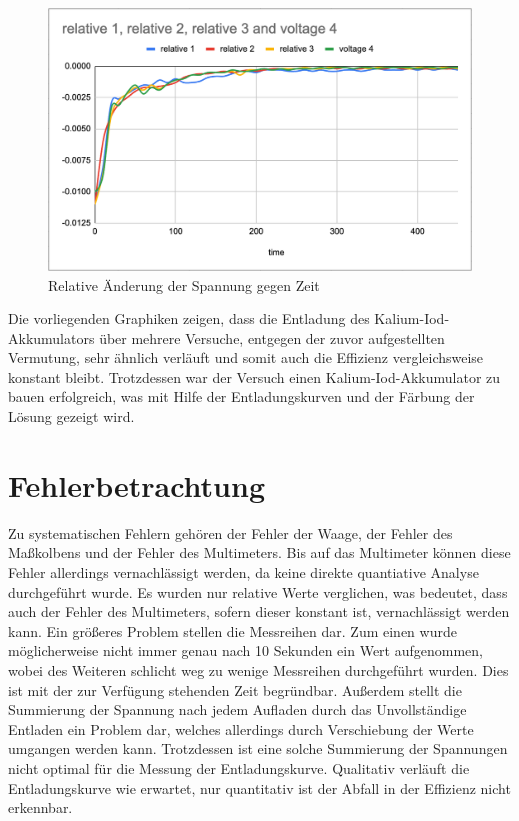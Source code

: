 \documentclass[11pt]{article}
\begin{document}
\begin{figure}[h!]
    \caption{Relative Änderung der Spannung gegen Zeit}
    \label{fig:relative_alt}
    \centering
    \includegraphics[scale=0.25]{relative_alt.png}
\end{figure}

\newpage
\noindent
Die vorliegenden Graphiken zeigen, dass die Entladung des Kalium-Iod-Akkumulators über mehrere Versuche, entgegen der zuvor aufgestellten Vermutung, sehr ähnlich verläuft und somit auch die Effizienz vergleichsweise konstant bleibt. Trotzdessen war der Versuch einen Kalium-Iod-Akkumulator zu bauen erfolgreich, was mit Hilfe der Entladungskurven und der Färbung der Lösung gezeigt wird.
\newpage
\section{Fehlerbetrachtung}
Zu systematischen Fehlern gehören der Fehler der Waage, der Fehler des Maßkolbens und der Fehler des Multimeters. Bis auf das Multimeter können diese Fehler allerdings vernachlässigt werden, da keine direkte quantiative Analyse durchgeführt wurde. Es wurden nur relative Werte verglichen, was bedeutet, dass auch der Fehler des Multimeters, sofern dieser konstant ist, vernachlässigt werden kann. Ein größeres Problem stellen die Messreihen dar. Zum einen wurde möglicherweise nicht immer genau nach 10 Sekunden ein Wert aufgenommen, wobei des Weiteren schlicht weg zu wenige Messreihen durchgeführt wurden. Dies ist mit der zur Verfügung stehenden Zeit begründbar. Außerdem stellt die Summierung der Spannung nach jedem Aufladen durch das Unvollständige Entladen ein Problem dar, welches allerdings durch Verschiebung der Werte umgangen werden kann. Trotzdessen ist eine solche Summierung der Spannungen nicht optimal für die Messung der Entladungskurve. Qualitativ verläuft die Entladungskurve wie erwartet, nur quantitativ ist der Abfall in der Effizienz nicht erkennbar.
\end{document}

